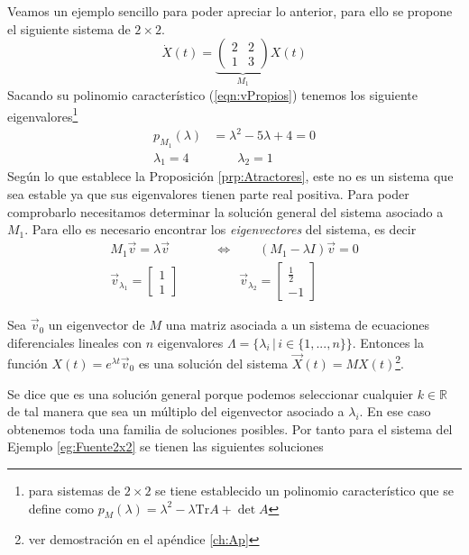 \begin{ejemplo}\label{eg:Fuente2x2}
	Veamos un ejemplo sencillo para poder apreciar lo anterior, para ello se propone el siguiente sistema de $2\times 2$.
	$$
		\dot{X}(t)=\underbrace{\begin{pmatrix}
				2 & 2\\
				1 & 3
		\end{pmatrix}}_{M_1}X(t)
	$$
	Sacando su polinomio característico (\ref{eqn:vPropios}) tenemos los siguiente eigenvalores\footnote{para sistemas de $2\times 2$ se tiene establecido un polinomio característico que se define como $p_M(\lambda)=\lambda^2-\lambda\text{Tr}A+\det A$}
	\begin{align*}
		p_{M_1}(\lambda)&=\lambda^2-5\lambda+4 = 0\\
		\lambda_1=4 &\qquad \lambda_2=1
	\end{align*}
	Según lo que establece la Proposición \ref{prp:Atractores}, este no es un sistema que sea estable ya que sus eigenvalores tienen parte real positiva. Para poder comprobarlo necesitamos determinar la solución general del sistema asociado a $M_1$. Para ello es necesario encontrar los \textit{eigenvectores} del sistema, es decir
	\begin{align*}
		M_1\vec{v}=\lambda\vec{v}\qquad&\Longleftrightarrow\qquad (M_1-\lambda I)\vec{v}=0 \\
		\vec{v}_{\lambda_1} = \begin{bmatrix}
			1\\
			1
		\end{bmatrix}  \qquad&\qquad \vec{v}_{\lambda_2} = \begin{bmatrix}
		\frac{1}{2}\\
		-1
		\end{bmatrix}
	\end{align*}
\end{ejemplo}
\begin{teorema}\label{teo:Solgral}
	Sea $\vec{v}_0$ un eigenvector de $M$ una matriz asociada a un sistema de ecuaciones diferenciales lineales con $n$ eigenvalores $\Lambda=\{\lambda_i\, |\, i\in\{1,...,n\}\}$. Entonces la función $X(t)=e^{\lambda t}\vec{v}_0$ es una solución del sistema $\vec{X}(t)=MX(t)$\footnote{ver demostración en el apéndice \ref{ch:Ap}}.
\end{teorema}
Se dice que es una solución general porque podemos seleccionar cualquier $k\in\mathbb{R}$ de tal manera que sea un múltiplo del eigenvector asociado a $\lambda_i$. En ese caso obtenemos toda una familia de soluciones posibles. Por tanto para el sistema del Ejemplo \ref{eg:Fuente2x2} se tienen las siguientes soluciones
